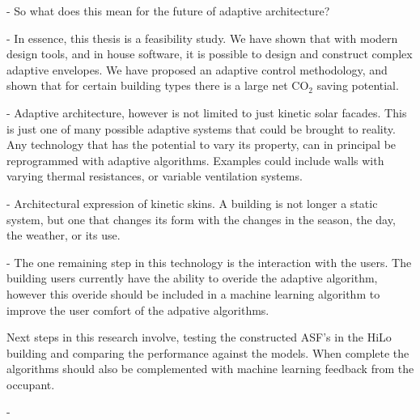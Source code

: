 - So what does this mean for the future of adaptive architecture?

- In essence, this thesis is a feasibility study. We have shown that with modern design tools, and in house software, it is possible to design and construct complex adaptive envelopes. We have proposed an adaptive control methodology, and shown that for certain building types there is a large net CO$_2$ saving potential. 

- Adaptive architecture, however is not limited to just kinetic solar facades. This is just one of many possible adaptive systems that could be brought to reality. Any technology that has the potential to vary its property, can in principal be reprogrammed with adaptive algorithms. Examples could include walls with varying thermal resistances, or variable ventilation systems. 

- Architectural expression of kinetic skins. A building is not longer a static system, but one that changes its form with the changes in the season, the day, the weather, or its use. 

- The one remaining step in this technology is the interaction with the users. The building users currently have the ability to overide the adaptive algorithm, however this overide should be included in a machine learning algorithm to improve the user comfort of the adpative algorithms. 

Next steps in this research involve, testing the constructed ASF's in the HiLo building and comparing the performance against the models. When complete the algorithms should also be complemented with machine learning feedback from the occupant. 

- 
